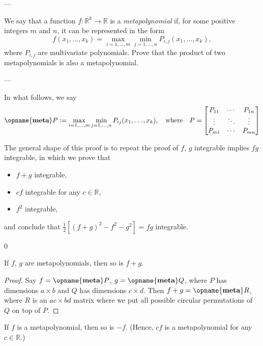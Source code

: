 
---

We say that a function $f:\mathbb R^k\to\mathbb R$ is a \emph{metapolynomial} if, for some positive integers $m$ and $n$, it can be represented in the form
\[f(x_1,\ldots,x_k)=\max_{i=1,\ldots,m}\min_{j=1,\ldots,n}P_{i,j}(x_1,\ldots,x_k),\]
where $P_{i,j}$ are multivariate polynomials. Prove that the product of two metapolynomials is also a metapolynomial.

---

In what follows, we say
\[
    \opname{\textbf{meta}}P:=\max_{i=1,\ldots,m}\min_{j=1,\ldots,n}P_{ij}(x_1,\ldots,x_k),
    \quad\text{where}\quad
    P=\begin{bmatrix}
        P_{11}&\cdots&P_{1n}\\
        \vdots&\ddots&\vdots\\
        P_{m1}&\cdots&P_{mn}
    \end{bmatrix}
\]
\begin{remark}
    The general shape of this proof is to repeat the proof of $f$, $g$ integrable implies $fg$ integrable, in which we prove that
    \begin{itemize}[itemsep=0em]
        \item $f+g$ integrable,
        \item $cf$ integrable for any $c\in\mathbb R$,
        \item $f^2$ integrable,
    \end{itemize}
    and conclude that $\frac12\left[(f+g)^2-f^2-g^2\right]=fg$ integrable.
\end{remark}
\setcounter{lemma}0
\begin{lemma}
    If $f$, $g$ are metapolynomials, then so is $f+g$.
\end{lemma}
\begin{proof}
    Say $f=\opname{\textbf{meta}}P$, $g=\opname{\textbf{meta}}Q$, where $P$ has dimensions $a\times b$ and $Q$ has dimensions $c\times d$. Then $f+g=\opname{\textbf{meta}}R$, where $R$ is an $ac\times bd$ matrix where we put all possible circular permutations of $Q$ on top of $P$.
\end{proof}
\begin{lemma}
    If $f$ is a metapolynomial, then so is $-f$. (Hence, $cf$ is a metapolynomial for any $c\in\mathbb R$.)
\end{lemma}
